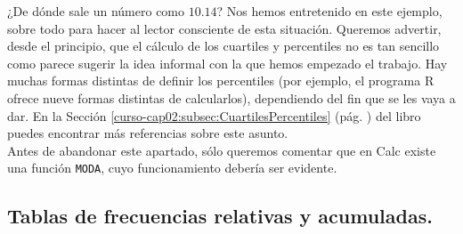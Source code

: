 \documentclass[10pt,a4paper]{article}\usepackage[]{graphicx}\usepackage[]{color}
\newcounter {cont01}
\begin{document}
¿De dónde sale un número como $10.14$? Nos hemos entretenido en este ejemplo, sobre todo para hacer al lector consciente de esta situación. Queremos advertir, desde el principio, que el cálculo de los cuartiles y percentiles no es tan sencillo como parece sugerir la idea informal con la que hemos empezado el trabajo. Hay muchas formas distintas de definir los percentiles (por ejemplo, el programa R ofrece nueve formas distintas de calcularlos), dependiendo del fin que se les vaya a dar. En la Sección \ref{curso-cap02:subsec:CuartilesPercentiles} (pág. \pageref{curso-cap02:subsec:CuartilesPercentiles}) del libro puedes encontrar más referencias sobre este asunto.\\

Antes de abandonar este apartado, sólo queremos comentar que en Calc existe una función {\tt MODA}, cuyo funcionamiento debería ser evidente.

\subsection{Tablas de frecuencias relativas y acumuladas.}
\label{tut01:subsec:TablasFrecuenciaRelativasAcumuladas}
\end{document}
